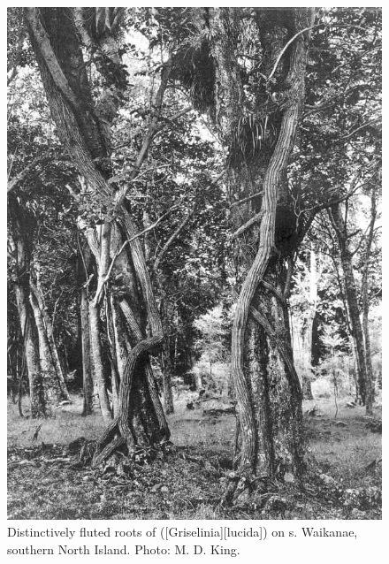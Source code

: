 \begin{figure}[htb]
	\centering
	\begin{minipage}[t]{0.486\textwidth}
		\centering
		\includegraphics[width=\textwidth]{graphics/figure46puka-roots.jpg}
    	\caption[Distinctively fluted roots of puka on kohekohes]{Distinctively fluted roots of  ([Griselinia][lucida]) on s.
    	Waikanae, southern North Island.
    	Photo: M. D. King.}%
    	\label{fig:46puka-roots}
	\end{minipage}\hfill%
	\begin{minipage}[t]{0.494\textwidth}
    	\centering

\end{minipage}
\end{figure}
